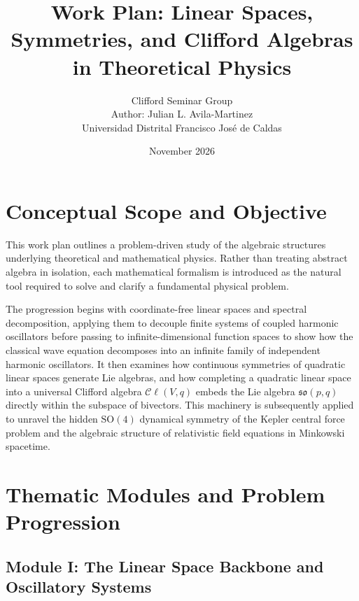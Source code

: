 \documentclass[11pt,a4paper]{article}
\title{\Large\bfseries Work Plan: Linear Spaces, Symmetries, and Clifford
  Algebras\\
  in Theoretical Physics}
\author{Clifford Seminar Group\\
  \small Author: Julian L. Avila-Martinez\\
  \small Universidad Distrital Francisco Jos\'{e} de Caldas}
\date{November 2026}
\newcommand{\Cl}{\mathcal{C}\ell}
\begin{document}
\maketitle

\section{Conceptual Scope and Objective}
\label{sec:scope}

This work plan outlines a problem-driven study of the algebraic structures
underlying theoretical and mathematical physics. Rather than treating abstract
algebra in isolation, each mathematical formalism is introduced as the natural
tool required to solve and clarify a fundamental physical problem.

The progression begins with coordinate-free linear spaces and spectral
decomposition, applying them to decouple finite systems of coupled harmonic
oscillators before passing to infinite-dimensional function spaces to show how
the classical wave equation decomposes into an infinite family of independent
harmonic oscillators. It then examines how continuous symmetries of quadratic
linear spaces generate Lie algebras, and how completing a quadratic linear
space into a universal Clifford algebra $\Cl(V,q)$ embeds the Lie algebra
$\mathfrak{so}(p,q)$ directly within the subspace of bivectors. This machinery
is subsequently applied to unravel the hidden $\mathrm{SO}(4)$ dynamical
symmetry of the Kepler central force problem and the algebraic structure of
relativistic field equations in Minkowski spacetime.

\section{Thematic Modules and Problem Progression}
\label{sec:modules}

\subsection{Module I: The Linear Space Backbone and Oscillatory Systems}
\label{subsec:mod1}
\end{document}
